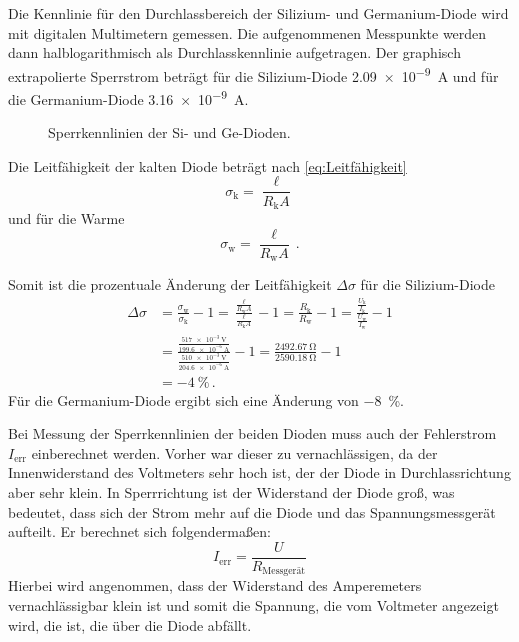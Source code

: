 \documentclass[
12pt,
a4paper,
bibliography=totocnumbered, %
BCOR=1cm, %
oneside, %
]{scrartcl}
\begin{document}
Die Kennlinie für den Durchlassbereich der Silizium- und Germanium-Diode wird mit digitalen Multimetern gemessen. Die aufgenommenen Messpunkte werden dann halblogarithmisch als Durchlasskennlinie aufgetragen. Der graphisch extrapolierte Sperrstrom beträgt für die Silizium-Diode \qty{2,09e-9}{\ampere} und für die Germanium-Diode \qty{3,16e-9}{\ampere}.
\begin{figure}[H]
	\caption{Sperrkennlinien der Si- und Ge-Dioden.}
	\label{fig:Durchlass}
\end{figure}

Die Leitfähigkeit der kalten Diode beträgt nach \autoref{eq:Leitfähigkeit}
\begin{equation}
	\sigma_{\text{k}} = \frac{\ell}{R_{\text{k}}A}
\end{equation}
und für die Warme
\begin{equation}
	\sigma_{\text{w}} = \frac{\ell}{R_{\text{w}}A} \,.
\end{equation}

Somit ist die prozentuale Änderung der Leitfähigkeit \(\Delta \sigma\) für die Silizium-Diode
\begin{align*}
	\Delta \sigma &= \frac{\sigma_{\text{w}}}{\sigma_{\text{k}}} -1 = \frac{\frac{\ell}{R_{\text{w}}A}}{\frac{\ell}{R_{\text{k}}A}} -1 = \frac{R_{\text{k}}}{R_{\text{w}}} -1 = \frac{\frac{U_{\text{k}}}{I_\text{k}}}{\frac{U_{\text{w}}}{I_{\text{w}}}} -1\\
	&= \frac{\frac{\qty{517e-3}{\volt}}{\qty{199,6e-6}{\ampere}}}{\frac{\qty{510e-3}{\volt}}{\qty{204,6e-6}{\ampere}}} -1 = \frac{\qty{2492,67}{\ohm}}{\qty{2590,18}{\ohm}} -1\\
	&= \qty{-4}{\percent} \,.
\end{align*}
Für die Germanium-Diode ergibt sich eine Änderung von \qty{-8}{\percent}.

Bei Messung der Sperrkennlinien der beiden Dioden muss auch der Fehlerstrom \(I_{\text{err}}\) einberechnet werden. Vorher war dieser zu vernachlässigen, da der Innenwiderstand des Voltmeters sehr hoch ist, der der Diode in Durchlassrichtung aber sehr klein. In Sperrrichtung ist der Widerstand der Diode groß, was bedeutet, dass sich der Strom mehr auf die Diode und das Spannungsmessgerät aufteilt. Er berechnet sich folgendermaßen:
\begin{equation*}
	I_{\text{err}} = \frac{U}{R_{\text{Messgerät}}}
\end{equation*}
Hierbei wird angenommen, dass der Widerstand des Amperemeters vernachlässigbar klein ist und somit die Spannung, die vom Voltmeter angezeigt wird, die ist, die über die Diode abfällt.
\end{document}
